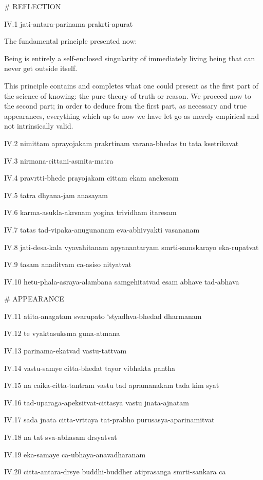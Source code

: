 # REFLECTION

IV.1
jati-antara-parinama prakrti-apurat

The fundamental principle presented now:

Being is entirely a self-enclosed singularity of
immediately living being that can never get outside itself.

    This principle contains and completes
    what one could present as the first part
    of the science of knowing:
    the pure theory of truth or reason.
    We proceed now to the second part;
    in order to deduce from the first part,
    as necessary and true appearances,
    everything which up to now we have
    let go as merely empirical
    and not intrinsically valid.

IV.2
nimittam aprayojakam prakrtinam varana-bhedas tu tata ksetrikavat

IV.3
nirmana-cittani-asmita-matra

IV.4
pravrtti-bhede prayojakam cittam ekam anekesam

IV.5
tatra dhyana-jam anasayam

IV.6
karma-asukla-akrsnam yogina trividham itaresam

IV.7
tatas tad-vipaka-anugunanam eva-abhivyakti vasananam

IV.8
jati-desa-kala vyavahitanam apyanantaryam smrti-samskarayo eka-rupatvat

IV.9
tasam anaditvam ca-asiso nityatvat

IV.10
hetu-phala-asraya-alambana samgehitatvad esam abhave tad-abhava

# APPEARANCE

IV.11
atita-anagatam svarupato ‘styadhva-bhedad dharmanam

IV.12
te vyaktasuksma guna-atmana

IV.13
parinama-ekatvad vastu-tattvam

IV.14
vastu-samye citta-bhedat tayor vibhakta pantha

IV.15
na caika-citta-tantram vastu tad apramanakam tada kim syat

IV.16
tad-uparaga-apeksitvat-cittasya vastu jnata-ajnatam

IV.17
sada jnata citta-vrttaya tat-prabho purusasya-aparinamitvat

IV.18
na tat sva-abhasam drsyatvat

IV.19
eka-samaye ca-ubhaya-anavadharanam

IV.20
citta-antara-drsye buddhi-buddher atiprasanga smrti-sankara ca

